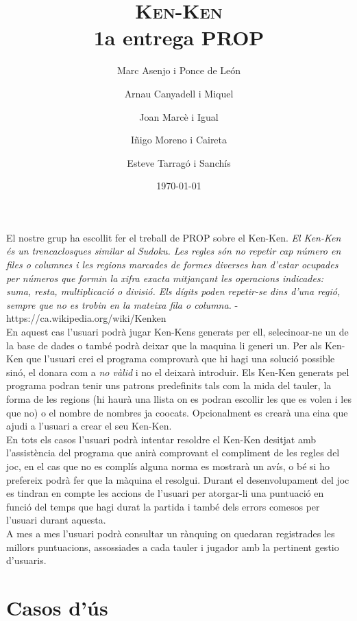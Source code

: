 \documentclass[a4paper,12pt]{article}
\begin{document}
\title{\textsc{Ken-Ken} \\ \large 1a entrega PROP}
\author{Marc Asenjo i Ponce de León \and
	Arnau Canyadell i Miquel \and
	Joan Marcè i Igual \and
	Iñigo Moreno i Caireta \and
	Esteve Tarragó i Sanchís}

\date{\today}
\maketitle

El nostre grup ha escollit fer el treball de PROP sobre el Ken-Ken.
\textit{El Ken-Ken és un trencaclosques similar al Sudoku.
 Les regles són no repetir cap número en files o columnes i les regions marcades de formes diverses han d'estar ocupades per números que formin la xifra exacta mitjançant les operacions indicades: suma, resta, multiplicació o divisió. Els dígits poden repetir-se dins d'una regió, sempre que no es trobin en la mateixa fila o columna.} -  https://ca.wikipedia.org/wiki/Kenken
\\


En aquest cas l'usuari podrà jugar Ken-Kens generats per ell, selecinoar-ne un de la base de dades o també podrà
deixar que la maquina li generi un. 
Per als Ken-Ken que l'usuari crei el programa comprovarà que hi hagi una solució
possible sinó, el donara com a \emph{no vàlid} i no el deixarà introduir. Els Ken-Ken generats 
pel programa podran tenir uns patrons predefinits tals com la mida del tauler, la forma de les 
regions (hi haurà una llista on es podran escollir les que es volen i les que no) o el nombre 
de nombres ja co\lgem ocats. Opcionalment es crearà una eina que ajudi a l'usuari a crear el seu Ken-Ken.
\\


En tots els casos l'usuari podrà intentar resoldre el Ken-Ken desitjat amb
l'assistència del programa que anirà comprovant el compliment de les regles del
joc, en el cas que no es complís alguna norma es mostrarà un avís, o bé si ho prefereix podrà fer que la màquina el resolgui. Durant el
desenvolupament del joc es tindran en compte les accions de l'usuari per
atorgar-li una puntuació en funció del temps que hagi durat la partida
i també dels errors comesos per l'usuari durant aquesta.
\\


A mes a mes l'usuari podrà consultar un rànquing on quedaran registrades les millors puntuacions,
assossiades a cada tauler i jugador amb la pertinent gestio d'usuaris.

\section{Casos d'ús}
\end{document}
